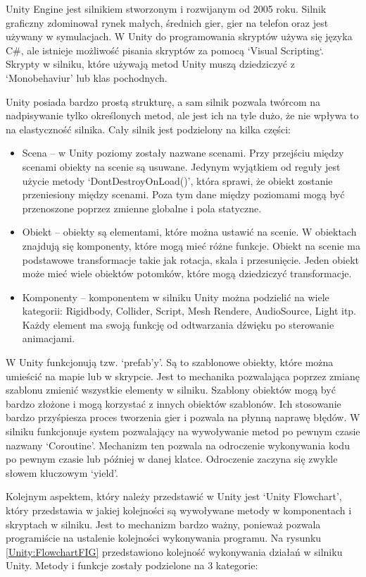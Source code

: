 \documentclass[12pt,twoside]{article}
\begin{document}
Unity Engine jest silnikiem stworzonym i rozwijanym od 2005 roku. Silnik
graficzny zdominował rynek małych, średnich gier, gier na telefon oraz jest
używany w symulacjach. W Unity do programowania skryptów używa się języka C\#,
ale istnieje możliwość pisania skryptów za pomocą `Visual Scripting`. Skrypty w silniku, które używają metod Unity muszą dziedziczyć z ‘Monobehaviur’ lub klas pochodnych. 

Unity posiada bardzo prostą strukturę, a sam silnik pozwala twórcom na
nadpisywanie tylko określonych metod, ale jest ich na tyle dużo, że nie wpływa
to na elastyczność silnika. Cały silnik jest podzielony na kilka
części\cite{Unity:Architecture}: 
\begin{itemize}
\item Scena – w Unity poziomy zostały nazwane scenami. Przy przejściu między
scenami obiekty na scenie są usuwane. Jedynym wyjątkiem od reguły jest użycie
metody ‘DontDestroyOnLoad()’, która sprawi, że obiekt zostanie przeniesiony
między scenami. Poza tym dane między poziomami mogą być przenoszone poprzez
zmienne globalne i pola statyczne.
\item Obiekt – obiekty są elementami, które można ustawić na scenie. W obiektach
znajdują się komponenty, które mogą mieć różne funkcje. Obiekt na scenie ma
podstawowe transformacje takie jak rotacja, skala i przesunięcie. Jeden obiekt
może mieć wiele obiektów potomków, które mogą dziedziczyć transformacje. 
\item Komponenty – komponentem w silniku Unity można podzielić na wiele
kategorii: Rigidbody, Collider, Script, Mesh Rendere, AudioSource, Light itp.
Każdy element ma swoją funkcję od odtwarzania dźwięku po sterowanie animacjami. 
\end{itemize}
W Unity funkcjonują tzw. ‘prefab'y’. Są to szablonowe obiekty, które można
umieścić na mapie lub w skrypcie. Jest to mechanika pozwalająca poprzez zmianę
szablonu zmienić wszystkie elementy w silniku. Szablony obiektów mogą być bardzo
złożone i mogą korzystać z innych obiektów szablonów. Ich stosowanie bardzo
przyśpiesza proces tworzenia gier i pozwala na płynną naprawę błędów. W silniku
funkcjonuje system pozwalający na wywoływanie metod po pewnym czasie nazwany
‘Coroutine’. Mechanizm ten pozwala na odroczenie wykonywania kodu po pewnym
czasie lub później w danej klatce. Odroczenie zaczyna się zwykle słowem
kluczowym ‘yield’.  

Kolejnym aspektem, który należy przedstawić w Unity jest ‘Unity Flowchart’,
który przedstawia w jakiej kolejności są wywoływane metody w komponentach i
skryptach w silniku. Jest to mechanizm bardzo ważny, ponieważ pozwala
programiście na ustalenie kolejności wykonywania programu. Na rysunku
\ref{Unity:FlowchartFIG} przedstawiono kolejność wykonywania działań w silniku
Unity. Metody i funkcje zostały podzielone na 3 kategorie:
\end{document}

